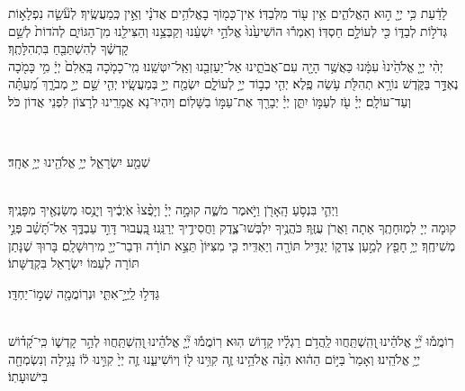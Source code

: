 \documentclass[twoside, openany, parskip=half, 11pt]{book}
\begin{document}
לָדַ֔עַת כִּ֥י יְיָ֖ ה֣וּא הָאֱלֹהִ֑ים אֵ֥ין ע֖וֹד מִלְּבַדּֽוֹ׃ \hfill \break
אֵין־כָּמ֖וֹךָ בָאֱלֹהִ֥ים אֲדֹנָ֗י וְאֵ֣ין כְּֽמַעֲשֶֽׂיךָ׃ \hfill \break
לְעֹ֘שֵׂ֤ה נִפְלָא֣וֹת גְּדֹל֣וֹת לְבַדּ֑וֹ כִּ֖י לְעוֹלָ֣ם חַסְדּֽוֹ׃ \hfill \break
וְאִמְר֕וּ הוֹשִׁיעֵ֙נוּ֙ אֱלֹהֵ֣י יִשְׁעֵ֔נוּ וְקַבְּצֵ֥נוּ וְהַצִּילֵ֖נוּ מִן־הַגּוֹיִ֑ם לְהֹדוֹת֙ לְשֵׁ֣ם קָדְשֶׁ֔ךָ לְהִשְׁתַּבֵּ֖חַ בִּתְהִלָּתֶֽךָ׃\\
יְהִ֨י יְיָ֤ אֱלֹהֵ֙ינוּ֙ עִמָּ֔נוּ כַּאֲשֶׁ֥ר הָיָ֖ה עִם־אֲבֹתֵ֑ינוּ אַל־יַעַזְבֵ֖נוּ וְאַֽל־יִטְּשֵֽׁנוּ׃ \hfill \break
מִֽי־כָמֹ֤כָה בָּֽאֵלִם֙ יְיָ֔ מִ֥י כָּמֹ֖כָה נֶאְדָּ֣ר בַּקֹּ֑דֶשׁ נוֹרָ֥א תְהִלֹּ֖ת עֹ֥שֵׂה פֶֽלֶא׃ \hfill \break
יְהִ֤י כְב֣וֹד יְיָ֣ לְעוֹלָ֑ם יִשְׂמַ֖ח יְיָ֣ בְּמַעֲשָֽׂיו׃ \hfill \break
יְהִ֤י שֵׁ֣ם יְיָ֣ מְבֹרָ֑ךְ מֵ֝עַתָּ֗ה וְעַד־עוֹלָֽם׃ \hfill \break
\melekhmalakhyimlokh \hfill \break
יְיָ֗ עֹ֖ז לְעַמּ֣וֹ יִתֵּ֑ן יְיָ֓ יְבָרֵ֖ךְ אֶת־עַמּ֣וֹ בַשָּׁלֽוֹם׃ \hfill \break
וְיִהְיוּ־נָא אֲמָרֵֽינוּ לְרָצוֹן לִפְנֵי אֲדוֹן כֹּל׃ \hfill \break

\vspace{-1.3\baselineskip}

\\
\begin{large}
שְׁמַ֖ע יִשְׂרָאֵ֑ל יְיָ֥ אֱלֹהֵ֖ינוּ יְיָ֥ אֶחָֽד׃
\end{large}

\\
וַיְהִ֛י בִּנְסֹ֥עַ הָֽאָרֹ֖ן וַיֹּ֣אמֶר מֹשֶׁ֑ה קוּמָ֣ה יְיָ֗ וְיָפֻ֨צוּ֙ אֹֽיְבֶ֔יךָ וְיָנֻ֥סוּ מְשַׂנְאֶ֖יךָ מִפָּנֶֽיךָ׃\\
קוּמָה יְיָ לִמְוּחָתֶֽךָ אַתָה וַאֲרֹן עֻזֶּֽךָ׃ \hfill \break
כֹּהֲנֶ֥יךָ יִלְבְּשׁוּ־צֶ֑דֶק וַחֲסִידֶ֥יךָ יְרַנֵּֽנוּ׃ \hfill \break
בַּֽ֭עֲבוּר דָּוִ֣ד עַבְדֶּ֑ךָ אַל־תָּ֝שֵׁ֗ב פְּנֵ֣י מְשִׁיחֶֽךָ׃ \hfill \break
יְיָ֥ חָפֵ֖ץ לְמַ֣עַן צִדְק֑וֹ יַגְדִּ֥יל תּוֹרָ֖ה וְיַאְדִּֽיר׃ \hfill \break
כִּ֤י מִצִּיּוֹן֙ תֵּצֵ֣א תוֹרָ֔ה וּדְבַר־יְיָ֖ מִירֽוּשָׁלָֽםִ׃ \hfill \break
בָּרוּךְ שֶׁנָּתַן תּוֹרָה לְעַמּוֹ יִשְׂרָאֵל בִּקְדֻשָּׁתוֹ׃ \hfill \break

\shatz
גַּדְּל֣וּ לַֽיְיָ֣־אִתִּ֑י וּנְרֽוֹמֲמָ֖ה שְׁמ֣וֹ־יַחְדָּֽו׃

\\
רֽוֹמֲמ֡וּ יְ֘יָ֤ אֱלֹהֵ֗ינוּ ֖וְהִֽשְׁתַּֽחֲווּ לַֽהֲדֹ֥ם רַגְלָ֗יו קָד֥וֹשׁ הֽוּא׃
רֽוֹמֲמ֡וּ יְ֘יָ֤ אֱלֹהֵ֗ינוּ ֖וְהִֽשְׁתַּֽחֲווּ לְהַ֣ר קָדְשׁ֑וֹ כִּֽי־קָ֝ד֗וֹשׁ יְיָ֥ אֱלֹהֵֽינוּ׃
וְאָמַר֙ בַּיּ֣וֹם הַה֔וּא הִנֵּ֨ה אֱלֹהֵ֥ינוּ זֶ֛ה קִוִּ֥ינוּ ל֖וֹ וְיוֹשִׁיעֵ֑נוּ זֶ֤ה יְיָ֙ קִוִּ֣ינוּ ל֔וֹ נָגִ֥ילָה וְנִשְׂמְחָ֖ה בִּישׁוּעָתֽוֹ׃
\end{document}
